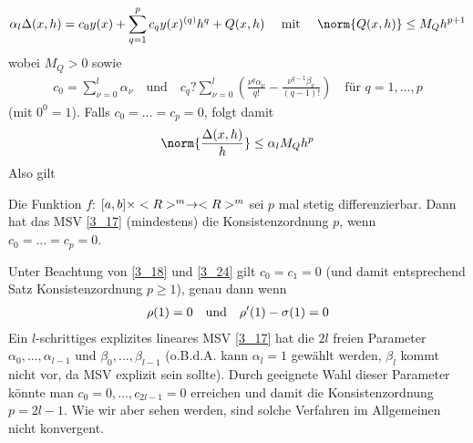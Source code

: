 \begin{align}
	\alpha_l\Delta(x,h) = c_0y(x) + \sum_{q=1}^p c_qy(x)^{(q)} h^q + Q(x,h)\quad\mit\quad\norm{Q(x,h)}\le M_Q h^{p+1} \notag
\end{align}
wobei $M_Q>0$ sowie
\begin{align}
	\label{3_24}
	c_0 = \sum_{\nu=0}^l \alpha_\nu\quad\text{und}\quad c_q ? \sum_{\nu=0}^l \left(\frac{\nu^q\alpha_\nu}{q!} - \frac{\nu^{q-1}\beta_\nu}{(q-1)!}\right)\quad\text{für } q=1,...,p
\end{align}
(mit $0^0=1$). Falls $c_0=\dots = c_p=0$, folgt damit
\begin{align}
	\norm{\frac{\Delta(x,h)}{h}}\le \alpha_l M_Q h^p\notag
\end{align}
Also gilt

\begin{proposition}
	Die Funktion $f$: $[a,b]\times<R>^m\to<R>^m$ sei $p$ mal stetig differenzierbar. Dann hat das MSV \cref{3_17} (mindestens) die Konsistenzordnung $p$, wenn $c_0=\dots=c_p=0$.
\end{proposition}

Unter Beachtung von \cref{3_18} und \cref{3_24} gilt $c_0=c_1=0$ (und damit entsprechend Satz  Konsistenzordnung $p\ge 1$), genau dann wenn
\begin{align}
	\rho(1)=0\quad\text{und}\quad \rho'(1)-\sigma(1)=0 \notag
\end{align}
Ein $l$-schrittiges explizites lineares MSV \cref{3_17} hat die $2l$ freien Parameter $\alpha_0,...,\alpha_{l-1}$ und $\beta_0,...,\beta_{l-1}$ (o.B.d.A. kann $\alpha_l=1$ gewählt werden, $\beta_l$ kommt nicht vor, da MSV explizit sein sollte). Durch geeignete Wahl dieser Parameter könnte man $c_0=0,...,c_{2l-1}=0$ erreichen und damit die Konsistenzordnung $p=2l-1$. Wie wir aber sehen werden, sind solche Verfahren im Allgemeinen nicht konvergent.

